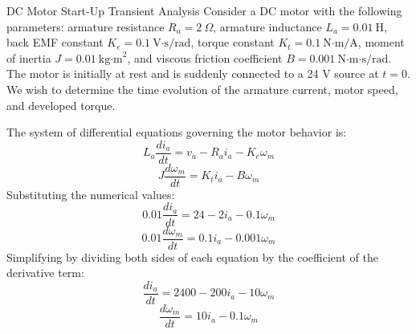 \begin{example}{DC Motor Start-Up Transient Analysis}
Consider a DC motor with the following parameters: armature resistance $R_a = 2\ \Omega$, armature inductance $L_a = 0.01\ \text{H}$, back EMF constant $K_e = 0.1\ \text{V·s/rad}$, torque constant $K_t = 0.1\ \text{N·m/A}$, moment of inertia $J = 0.01\ \text{kg·m}^2$, and viscous friction coefficient $B = 0.001\ \text{N·m·s/rad}$. The motor is initially at rest and is suddenly connected to a 24 V source at $t = 0$. We wish to determine the time evolution of the armature current, motor speed, and developed torque.

The system of differential equations governing the motor behavior is:
\begin{equation}
L_a \frac{di_a}{dt} = v_a - R_a i_a - K_e \omega_m
\end{equation}
\begin{equation}
J \frac{d\omega_m}{dt} = K_t i_a - B \omega_m
\end{equation}
Substituting the numerical values:
\begin{equation}
0.01 \frac{di_a}{dt} = 24 - 2i_a - 0.1\omega_m
\end{equation}
\begin{equation}
0.01 \frac{d\omega_m}{dt} = 0.1i_a - 0.001\omega_m
\end{equation}
Simplifying by dividing both sides of each equation by the coefficient of the derivative term:
\begin{equation}
\frac{di_a}{dt} = 2400 - 200i_a - 10\omega_m
\end{equation}
\begin{equation}
\frac{d\omega_m}{dt} = 10i_a - 0.1\omega_m
\end{equation}


\end{example}

